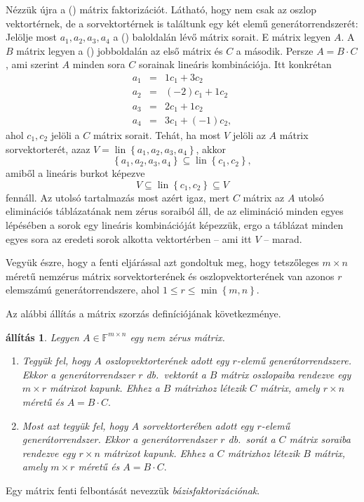 \documentclass[a4paper, showtrims]{memoir}
\theoremstyle{plain}
\newtheorem{proposition}{állítás}[chapter]
\theoremstyle{remark}
\theoremstyle{definition}
\DeclareMathOperator{\lin}{lin}
\begin{document}
Nézzük újra a (\dag) mátrix faktorizációt.
Látható, hogy nem csak az oszlop vektortérnek, de a sorvektortérnek is találtunk egy két elemű generátorrendszerét:
Jelölje most $a_1,a_2,a_3,a_4$ a (\dag) baloldalán lévő mátrix sorait.
E mátrix legyen $A$.
A $B$ mátrix legyen a (\dag) jobboldalán az első mátrix és $C$ a második.
Persze $A=B\cdot C$, ami szerint $A$ minden sora $C$ sorainak lineáris kombinációja.
Itt konkrétan
\begin{eqnarray*}
    a_1&=& 1c_1+3c_2\\
    a_2&=& (-2)c_1+1c_2\\
    a_3&=& 2c_1+1c_2\\
    a_4&=& 3c_1+(-1)c_2,
\end{eqnarray*}
ahol $c_1,c_2$ jelöli a $C$ mátrix sorait.
Tehát, ha most $V$ jelöli az $A$ mátrix sorvektorterét, azaz
\(V=\lin\left\{ a_1,a_2,a_3,a_4 \right\}\),
akkor 
\[
    \left\{ a_1,a_2,a_3,a_4 \right\}
    \subseteq
    \lin\left\{ c_1,c_2 \right\},
\]
amiből a lineáris burkot képezve
\[
    V\subseteq\lin\left\{ c_1,c_2 \right\}\subseteq V
\]
fennáll. 
Az utolsó tartalmazás most azért igaz, 
mert $C$ mátrix az $A$ utolsó eliminációs táblázatának nem zérus soraiból áll, 
de az elimináció minden egyes lépésében a sorok egy lineáris kombinációját képezzük, 
ergo a táblázat minden egyes sora az eredeti sorok alkotta vektortérben -- ami itt $V$ -- marad.

Vegyük észre, hogy a fenti eljárással azt gondoltuk meg, 
hogy tetszőleges $m\times n$ méretű nemzérus mátrix
sorvektorterének és oszlopvektorterének van azonos $r$ elemszámú generátorrendszere,
ahol $1\leq r\leq\min\left\{ m,n \right\}$.

Az alábbi állítás a mátrix szorzás definíciójának következménye.
\begin{proposition}
	Legyen $A\in\mathbb{F}^{m\times n}$ egy nem zérus mátrix.
	\begin{enumerate}
		\item
		      Tegyük fel, hogy $A$ oszlopvektorterének adott egy $r$-elemű generátorrendszere.
		      Ekkor a generátorrendszer $r$ db.~vektorát a $B$ mátrix oszlopaiba rendezve egy $m\times r$ mátrixot kapunk.
		      Ehhez a $B$ mátrixhoz létezik $C$ mátrix, amely $r\times n$ méretű és
		      \(
		      A=B\cdot C.
		      \)
		\item
		      Most azt tegyük fel, hogy $A$ sorvektorterében adott egy $r$-elemű generátorrendszer.
		      Ekkor a generátorrendszer $r$ db.~sorát a $C$ mátrix soraiba rendezve egy $r\times n$ mátrixot kapunk.
		      Ehhez a $C$ mátrixhoz létezik $B$ mátrix, amely $m\times r$ méretű és
		      \(
		      A=B\cdot C.
		      \)
              \qedhere
	\end{enumerate}
\end{proposition}
Egy mátrix fenti felbontását nevezzük \emph{bázisfaktorizációnak}.
\end{document}
